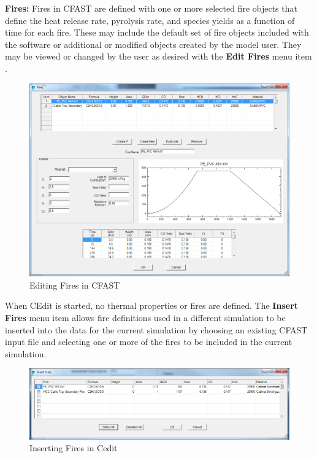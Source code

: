 \newpage

\textbf{Fires:} Fires in CFAST are defined with one or more selected fire objects that define the heat release rate, pyrolysis rate, and species yields as a function of time for each fire.  These may include the default set of fire objects included with the software or additional or modified objects created by the model user. They may be viewed or changed by the user as desired with the \textbf{Edit Fires} menu item \label{Fires_Menu}.

\begin{figure}[h!]
\begin{center}
\includegraphics[width=6.5in]{FIGURES/Running_CFAST/Fire_Objects_Edit}
Editing Fires in CFAST
\end{center}
\end{figure}
\newpage

When CEdit is started, no thermal properties or fires are defined.  The \textbf{Insert Fires} menu item allows fire definitions used in a different simulation to be inserted into the data for the current simulation by choosing an existing CFAST input file and selecting one or more of the fires to be included in the current simulation.

\begin{figure}[h!]
\begin{center}
\includegraphics[width=6.5in]{FIGURES/Running_CFAST/Fire_Objects_Insert}
Inserting Fires in Cedit
\end{center}
\end{figure}

